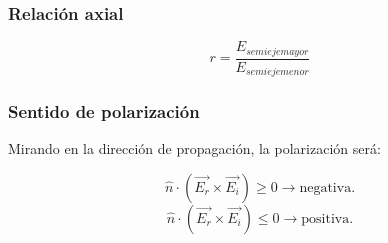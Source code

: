 \documentclass[12pt,a4paper]{article}
\begin{document}
\subsubsection{Relación axial}
\label{ssub:relacion_axial}

\[ r = \frac{E_{semieje mayor}}{E_{semieje menor}} \] 

\subsubsection{Sentido de polarización}
\label{ssub:sentido_de_polarizacion}

Mirando en la dirección de propagación, la polarización será:

\[ \hat{n} \cdot \left( \vec{E_r} \times \vec{E_i} \right) \geq 0
\rightarrow \mbox{negativa}. \]
\[ \hat{n} \cdot \left( \vec{E_r} \times \vec{E_i} \right) \leq 0
\rightarrow \mbox{positiva}. \]
\end{document}
